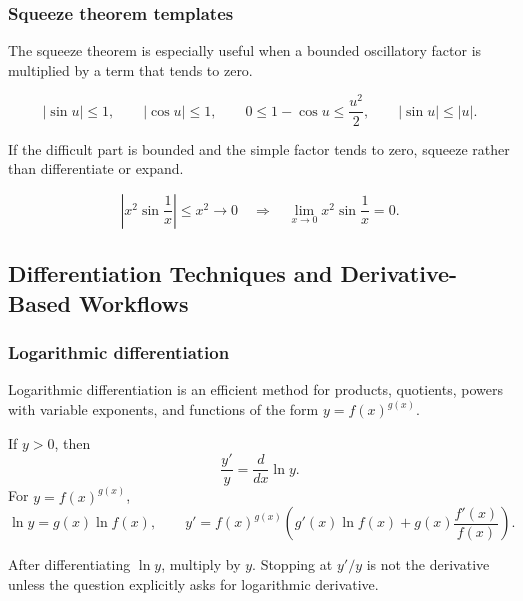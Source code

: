 \newpage
\subsubsection{Squeeze theorem templates}
\begin{extension}
The squeeze theorem is especially useful when a bounded oscillatory factor is
multiplied by a term that tends to zero.
\end{extension}

\begin{keyformula}[title={Common Squeeze Forms}]
\[
|\sin u|\le 1,
\qquad
|\cos u|\le 1,
\qquad
0\le 1-\cos u\le \frac{u^2}{2},
\qquad
|\sin u|\le |u|.
\]
\end{keyformula}

\begin{examtip}
If the difficult part is bounded and the simple factor tends to zero, squeeze
rather than differentiate or expand.
\end{examtip}

\begin{examplebox}[title={Oscillatory Squeeze}]
\[
\left|x^2\sin\frac1x\right|\le x^2\to0
\quad\Rightarrow\quad
\lim_{x\to0}x^2\sin\frac1x=0.
\]
\end{examplebox}

\newpage
\subsection{Differentiation Techniques and Derivative-Based Workflows}

\subsubsection{Logarithmic differentiation}
\begin{extension}
Logarithmic differentiation is an efficient method for products, quotients,
powers with variable exponents, and functions of the form \(y=f(x)^{g(x)}\).
\end{extension}

\begin{keyformula}[title={Logarithmic Differentiation Template}]
If \(y>0\), then
\[
\frac{y'}{y}=\frac{d}{dx}\ln y.
\]
For \(y=f(x)^{g(x)}\),
\[
\ln y=g(x)\ln f(x),
\qquad
 y'=f(x)^{g(x)}\left(g'(x)\ln f(x)+g(x)\frac{f'(x)}{f(x)}\right).
\]
\end{keyformula}

\begin{commonmistake}
After differentiating \(\ln y\), multiply by \(y\).  Stopping at \(y'/y\) is
not the derivative unless the question explicitly asks for logarithmic derivative.
\end{commonmistake}

